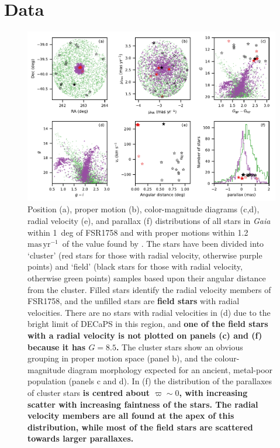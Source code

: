 \documentclass[fleqn,usenatbib]{mnras}
\newcommand{\masyr}{\ensuremath{\textrm{mas}\,\textrm{yr}^{-1}}}
\begin{document}
\section{Data}\label{sec:data}
\begin{figure}
\includegraphics[width=\textwidth]{figures/cmd.pdf}
\caption{Position (a), proper motion (b), color-magnitude diagrams (c,d), radial velocity (e), and parallax (f) distributions of all stars in \textit{Gaia} within 1~deg of FSR1758 and with proper motions within 1.2~\masyr\ of the value found by . The stars have been divided into `cluster' (red stars for those with radial velocity, otherwise purple points) and `field' (black stars for those with radial velocity, otherwise green points) samples based upon their angular distance from the cluster. Filled stars identify the radial velocity members of FSR1758, and the unfilled stars are \textbf{field stars} with radial velocities. There are no stars with radial velocities in (d) due to the bright limit of DECaPS in this region, and \textbf{one of the field stars with a radial velocity is not plotted on panels (c) and (f) because it has $G=8.5$.} The cluster stars show an obvious grouping in proper motion space (panel b), and the colour-magnitude diagram morphology expected for an ancient, metal-poor population (panels c and d). In (f) the distribution of the parallaxes of cluster stars \textbf{is centred about $\varpi\sim0$, with increasing scatter with increasing faintness of the stars. The radial velocity members are all found at the apex of this distribution, while most of the field stars are scattered towards larger parallaxes.}}
\label{fig:cmd}
\end{figure}
\end{document}
